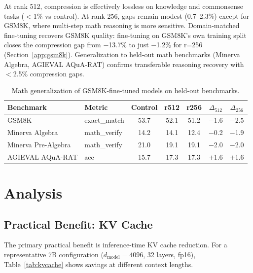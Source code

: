 \documentclass[11pt]{article}
\newcommand{\dmodel}{d_{\text{model}}}
\begin{document}
At rank 512, compression is effectively lossless on knowledge and commonsense tasks ($<$1\% vs control). At rank 256, gaps remain modest (0.7--2.3\%) except for GSM8K, where multi-step math reasoning is more sensitive. Domain-matched fine-tuning recovers GSM8K quality: fine-tuning on GSM8K's own training split closes the compression gap from $-$13.7\% to just $-$1.2\% for r=256 (Section~\ref{app:gsm8k}). Generalization to held-out math benchmarks (Minerva Algebra, AGIEVAL AQuA-RAT) confirms transferable reasoning recovery with $<$2.5\% compression gaps.

\begin{table}[h]
\centering
\caption{Math generalization of GSM8K-fine-tuned models on held-out benchmarks.}
\label{tab:math_generalization}
\begin{tabular}{llccccc}
\toprule
Benchmark & Metric & Control & r512 & r256 & $\Delta_{512}$ & $\Delta_{256}$ \\
\midrule
GSM8K & exact\_match & 53.7 & 52.1 & 51.2 & $-$1.6 & $-$2.5 \\
Minerva Algebra & math\_verify & 14.2 & 14.1 & 12.4 & $-$0.2 & $-$1.9 \\
Minerva Pre-Algebra & math\_verify & 21.0 & 19.1 & 19.1 & $-$2.0 & $-$2.0 \\
AGIEVAL AQuA-RAT & acc & 15.7 & 17.3 & 17.3 & $+$1.6 & $+$1.6 \\
\bottomrule
\end{tabular}
\end{table}


\section{Analysis}

\subsection{Practical Benefit: KV Cache}

The primary practical benefit is inference-time KV cache reduction. For a representative 7B configuration ($\dmodel = 4096$, 32 layers, fp16), Table~\ref{tab:kvcache} shows savings at different context lengths.
\end{document}
